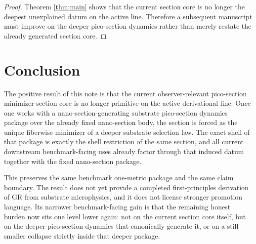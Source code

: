 \documentclass[11pt]{article}
\begin{document}
\begin{proof}
Theorem \ref{thm:main} shows that the current section core is no longer the deepest unexplained datum on the active line. Therefore a subsequent manuscript must improve on the deeper pico-section dynamics rather than merely restate the already generated section core.
\end{proof}

\section{Conclusion}

The positive result of this note is that the current observer-relevant pico-section minimizer-section core is no longer primitive on the active derivational line. Once one works with a nano-section-generating substrate pico-section dynamics package over the already fixed nano-section body, the section is forced as the unique fiberwise minimizer of a deeper substrate selection law. The exact shell of that package is exactly the shell restriction of the same section, and all current downstream benchmark-facing uses already factor through that induced datum together with the fixed nano-section package.

This preserves the same benchmark one-metric package and the same claim boundary. The result does not yet provide a completed first-principles derivation of GR from substrate microphysics, and it does not license stronger promotion language. Its narrower benchmark-facing gain is that the remaining honest burden now sits one level lower again: not on the current section core itself, but on the deeper pico-section dynamics that canonically generate it, or on a still smaller collapse strictly inside that deeper package.
\end{document}
